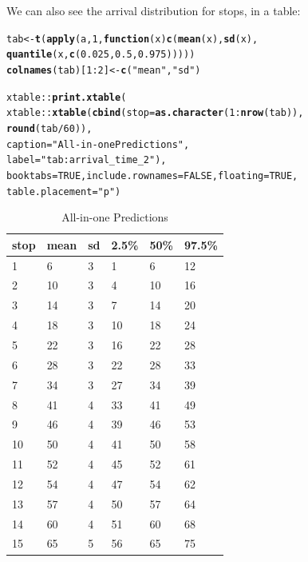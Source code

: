 \documentclass[11pt]{article}\usepackage[]{graphicx}\usepackage[]{color}
\makeatletter
\newcommand{\hlnum}[1]{\textcolor[rgb]{0.686,0.059,0.569}{#1}}%
\newcommand{\hlstr}[1]{\textcolor[rgb]{0.192,0.494,0.8}{#1}}%
\newcommand{\hlopt}[1]{\textcolor[rgb]{0,0,0}{#1}}%
\newcommand{\hlstd}[1]{\textcolor[rgb]{0.345,0.345,0.345}{#1}}%
\newcommand{\hlkwa}[1]{\textcolor[rgb]{0.161,0.373,0.58}{\textbf{#1}}}%
\newcommand{\hlkwb}[1]{\textcolor[rgb]{0.69,0.353,0.396}{#1}}%
\newcommand{\hlkwc}[1]{\textcolor[rgb]{0.333,0.667,0.333}{#1}}%
\newcommand{\hlkwd}[1]{\textcolor[rgb]{0.737,0.353,0.396}{\textbf{#1}}}%
\newenvironment{kframe}{%
 \def\at@end@of@kframe{}%
 \ifinner\ifhmode%
  \def\at@end@of@kframe{\end{minipage}}%
  \begin{minipage}{\columnwidth}%
 \fi\fi%
 \def\FrameCommand##1{\hskip\@totalleftmargin \hskip-\fboxsep
 \colorbox{shadecolor}{##1}\hskip-\fboxsep
     \hskip-\linewidth \hskip-\@totalleftmargin \hskip\columnwidth}%
 \MakeFramed {\advance\hsize-\width
   \@totalleftmargin\z@ \linewidth\hsize
   \@setminipage}}%
 {\par\unskip\endMakeFramed%
 \at@end@of@kframe}
\makeatother
\begin{document}
We can also see the arrival distribution for stops, in a table:
\begin{kframe}
\begin{alltt}
\hlstd{tab} \hlkwb{<-} \hlkwd{t}\hlstd{(}\hlkwd{apply}\hlstd{(a,} \hlnum{1}\hlstd{,} \hlkwa{function}\hlstd{(}\hlkwc{x}\hlstd{)} \hlkwd{c}\hlstd{(}\hlkwd{mean}\hlstd{(x),} \hlkwd{sd}\hlstd{(x),}
                                   \hlkwd{quantile}\hlstd{(x,} \hlkwd{c}\hlstd{(}\hlnum{0.025}\hlstd{,} \hlnum{0.5}\hlstd{,} \hlnum{0.975}\hlstd{)))))}
\hlkwd{colnames}\hlstd{(tab)[}\hlnum{1}\hlopt{:}\hlnum{2}\hlstd{]} \hlkwb{<-} \hlkwd{c}\hlstd{(}\hlstr{"mean"}\hlstd{,} \hlstr{"sd"}\hlstd{)}

\hlstd{xtable}\hlopt{::}\hlkwd{print.xtable}\hlstd{(}
    \hlstd{xtable}\hlopt{::}\hlkwd{xtable}\hlstd{(}\hlkwd{cbind}\hlstd{(}\hlkwc{stop} \hlstd{=} \hlkwd{as.character}\hlstd{(}\hlnum{1}\hlopt{:}\hlkwd{nrow}\hlstd{(tab)),}
                         \hlkwd{round}\hlstd{(tab} \hlopt{/} \hlnum{60}\hlstd{)),}
                   \hlkwc{caption} \hlstd{=} \hlstr{"All-in-one Predictions"}\hlstd{,}
                   \hlkwc{label} \hlstd{=} \hlstr{"tab:arrival_time_2"}\hlstd{),}
    \hlkwc{booktabs} \hlstd{=} \hlnum{TRUE}\hlstd{,} \hlkwc{include.rownames} \hlstd{=} \hlnum{FALSE}\hlstd{,} \hlkwc{floating} \hlstd{=} \hlnum{TRUE}\hlstd{,}
    \hlkwc{table.placement} \hlstd{=} \hlstr{"p"}\hlstd{)}
\end{alltt}
\end{kframe}%
\begin{table}[p]
\centering
\begin{tabular}{llllll}
  \toprule
stop & mean & sd & 2.5\% & 50\% & 97.5\% \\ 
  \midrule
1 & 6 & 3 & 1 & 6 & 12 \\ 
  2 & 10 & 3 & 4 & 10 & 16 \\ 
  3 & 14 & 3 & 7 & 14 & 20 \\ 
  4 & 18 & 3 & 10 & 18 & 24 \\ 
  5 & 22 & 3 & 16 & 22 & 28 \\ 
  6 & 28 & 3 & 22 & 28 & 33 \\ 
  7 & 34 & 3 & 27 & 34 & 39 \\ 
  8 & 41 & 4 & 33 & 41 & 49 \\ 
  9 & 46 & 4 & 39 & 46 & 53 \\ 
  10 & 50 & 4 & 41 & 50 & 58 \\ 
  11 & 52 & 4 & 45 & 52 & 61 \\ 
  12 & 54 & 4 & 47 & 54 & 62 \\ 
  13 & 57 & 4 & 50 & 57 & 64 \\ 
  14 & 60 & 4 & 51 & 60 & 68 \\ 
  15 & 65 & 5 & 56 & 65 & 75 \\ 
   \bottomrule
\end{tabular}
\caption{All-in-one Predictions} 
\label{tab:arrival_time_2}
\end{table}
\end{document}
